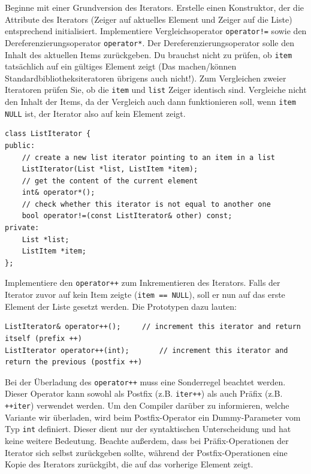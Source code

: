 Beginne mit einer Grundversion des Iterators.
Erstelle einen Konstruktor, der die Attribute des Iterators (Zeiger auf aktuelles Element und Zeiger auf die Liste) entsprechend initialisiert.
Implementiere Vergleichsoperator \texttt{operator!=} sowie den Dereferenzierungsoperator \texttt{operator*}.
Der Dereferenzierungsoperator solle den Inhalt des aktuellen Items zurückgeben.
Du brauchst nicht zu prüfen, ob \texttt{item} tatsächlich auf ein gültiges Element zeigt (Das machen/können Standardbibliotheksiteratoren übrigens auch nicht!).
Zum Vergleichen zweier Iteratoren prüfen Sie, ob die \texttt{item} und \texttt{list} Zeiger identisch sind.
Vergleiche nicht den Inhalt der Items, da der Vergleich auch dann funktionieren soll, wenn \texttt{item} \texttt{NULL} ist, der Iterator also auf kein Element zeigt.

\begin{lstlisting}
class ListIterator {
public:
	// create a new list iterator pointing to an item in a list
	ListIterator(List *list, ListItem *item);
	// get the content of the current element
	int& operator*();
	// check whether this iterator is not equal to another one
	bool operator!=(const ListIterator& other) const;
private:
	List *list;
	ListItem *item;
};
\end{lstlisting}


Implementiere den \texttt{operator++} zum Inkrementieren des Iterators.
Falls der Iterator zuvor auf kein Item zeigte (\texttt{item == NULL}), soll er nun auf das erste Element der Liste gesetzt werden.
Die Prototypen dazu lauten:
\begin{lstlisting}
ListIterator& operator++();		// increment this iterator and return itself (prefix ++)
ListIterator operator++(int);		// increment this iterator and return the previous (postfix ++)
\end{lstlisting}

Bei der Überladung des \texttt{operator++} muss eine Sonderregel beachtet werden.
Dieser Operator kann sowohl als Postfix (z.B. \texttt{iter++}) als auch Präfix (z.B. \texttt{++iter}) verwendet werden.
Um den Compiler darüber zu informieren, welche Variante wir überladen, wird beim Postfix-Operator ein Dummy-Parameter vom Typ \texttt{int} definiert.
Dieser dient nur der syntaktischen Unterscheidung und hat keine weitere Bedeutung.
Beachte außerdem, dass bei Präfix-Operationen der Iterator sich selbst zurückgeben sollte, während der Postfix-Operationen eine Kopie des Iterators zurückgibt, die auf das vorherige Element zeigt.


